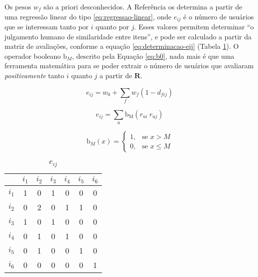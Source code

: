 Os pesos $w_f$ são a priori desconhecidos. A Referência  os determina a partir de uma regressão linear do tipo \ref{eq:regressao-linear}, onde $e_{ij}$ é o número de usuários que se interessam tanto por $i$ quanto por $j$. Esses valores permitem determinar ``o julgamento humano de similaridade entre itens'', e pode ser calculado a partir da matriz de avaliações, conforme a equação \ref{eq:determinacao-eij} (Tabela \ref{tab:eij}). O operador booleano $\mathrm{b}_M$, descrito pela Equação \ref{eq:b0}, nada mais é que uma ferramenta matemática para se poder extrair o número de usuários que avaliaram \textit{positivamente} tanto $i$ quanto $j$ a partir de $\mathbf{R}$. 


\begin{equation}
\label{eq:regressao-linear} 
    e_{ij} = w_0 + \sum_{f}{w_{f} \left(1-d_{fij}\right)}
\end{equation} 


\begin{equation}
\label{eq:determinacao-eij} 
    e_{ij} = \sum_{u}{\mathrm{b_M}\left(r_{ui} ~ r_{uj}\right)}
\end{equation} 

\begin{equation}
\label{eq:b0}
\mathrm{b}_M\left(x\right) = 
\begin{cases}
1, &\text{se }x>M \\
0, &\text{se }x\leq M
\end{cases} 
\end{equation}

\begin{table}[p]
\begin{center}
    \caption{$e_{ij}$}
    \label{tab:eij}
    \begin{tabular}{ | c | c | c | c | c | c | c | } 
    \hline
     & $i_1$ & $i_2$ & $i_3$ & $i_4$ & $i_5$ & $i_6$  \\ \hline
     $i_1$ & 1 & 0 & 1 & 0 & 0 & 0 \\ \hline
     $i_2$ & 0 & 2 & 0 & 1 & 1 & 0  \\ \hline
     $i_3$ & 1 & 0 & 1 & 0 & 0 & 0 \\ \hline
     $i_4$ & 0 & 1 & 0 & 1 & 0 & 0 \\ \hline
     $i_5$ & 0 & 1 & 0 & 0 & 1 & 0 \\ \hline
     $i_6$ & 0 & 0 & 0 & 0 & 0 & 1 \\ \hline
    \end{tabular}
\end{center}
\end{table}

